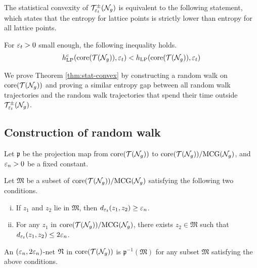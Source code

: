The statistical convexity of $\mathcal{T}_{\varepsilon_t}^{\pm}(\mathcal{N}_g)$ is equivalent to the following statement, which states that the entropy for \concave lattice points is strictly lower than entropy for all lattice points.

\begin{theorem}
  \label{thm:stat-convex}
  For $\varepsilon_t > 0$ small enough, the following inequality holds.
  \begin{align*}
    h_{\mathrm{LP}}^c(\mathrm{core}(\mathcal{T}(\mathcal{N}_g)), \varepsilon_t) < h_{\mathrm{LP}}(\mathrm{core}(\mathcal{T}(\mathcal{N}_g)), \varepsilon_t)
  \end{align*}
\end{theorem}

We prove Theorem \ref{thm:stat-convex} by constructing a random walk on $\mathrm{core}(\mathcal{T}(\mathcal{N}_g))$ and proving a similar entropy gap between all random walk trajectories and the random walk trajectories that spend their time outside $\mathcal{T}_{\varepsilon_t}^{\pm}(\mathcal{N}_g)$.

\subsection{Construction of random walk}
\label{sec:constr-rand-walk}

Let $\mathfrak{p}$ be the projection map from $\mathrm{core}(\mathcal{T}(\mathcal{N}_g))$ to $\mathrm{core}(\mathcal{T}(\mathcal{N}_g)) / \mathrm{MCG}(\mathcal{N}_g)$, and $\varepsilon_n > 0$ be a fixed constant.

\begin{definition}
  Let $\mathfrak{M}$ be a subset of $\mathrm{core}(\mathcal{T}(\mathcal{N}_g)) / \mathrm{MCG}(\mathcal{N}_g)$ satisfying the following two conditions.
  \begin{enumerate}[(i)]
  \item If $z_1$ and $z_2$ lie in $\mathfrak{M}$, then $d_{\varepsilon_t}(z_1, z_2) \geq \varepsilon_n$.
  \item For any $z_1$ in $\mathrm{core}(\mathcal{T}(\mathcal{N}_g)) / \mathrm{MCG}(\mathcal{N}_g)$, there exists $z_2 \in \mathfrak{M}$ such that $d_{\varepsilon_t}(z_1, z_2) \leq 2 \varepsilon_n$.
  \end{enumerate}
  An $(\varepsilon_n, 2\varepsilon_n)$-net $\mathfrak{N}$ in $\mathrm{core}(\mathcal{T}(\mathcal{N}_g))$ is $\mathfrak{p}^{-1}(\mathfrak{M})$ for any subset $\mathfrak{M}$ satisfying the above conditions.
\end{definition}

